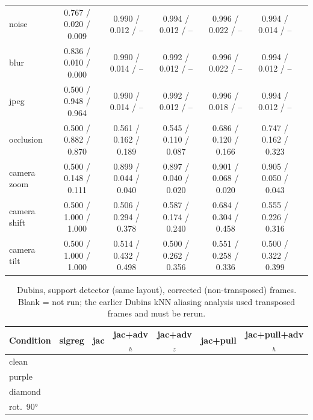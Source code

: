 \documentclass{article}
\begin{document}
\begin{table}[t]
{\begin{tabular}{lcccccc}
noise & 0.767 / 0.020 / 0.009 & 0.990 / 0.012 / -- & 0.994 / 0.012 / -- & 0.996 / 0.022 / -- & 0.994 / 0.014 / -- &  \\
blur & 0.836 / 0.010 / 0.000 & 0.990 / 0.014 / -- & 0.992 / 0.012 / -- & 0.996 / 0.022 / -- & 0.994 / 0.012 / -- &  \\
jpeg & 0.500 / 0.948 / 0.964 & 0.990 / 0.014 / -- & 0.992 / 0.012 / -- & 0.996 / 0.018 / -- & 0.994 / 0.012 / -- &  \\
occlusion & 0.500 / 0.882 / 0.870 & 0.561 / 0.162 / 0.189 & 0.545 / 0.110 / 0.087 & 0.686 / 0.120 / 0.166 & 0.747 / 0.162 / 0.323 &  \\
camera zoom & 0.500 / 0.148 / 0.111 & 0.899 / 0.044 / 0.040 & 0.897 / 0.040 / 0.020 & 0.901 / 0.068 / 0.020 & 0.905 / 0.050 / 0.043 &  \\
camera shift & 0.500 / 1.000 / 1.000 & 0.506 / 0.294 / 0.378 & 0.587 / 0.174 / 0.240 & 0.684 / 0.304 / 0.458 & 0.555 / 0.226 / 0.316 &  \\
camera tilt & 0.500 / 1.000 / 1.000 & 0.514 / 0.432 / 0.498 & 0.500 / 0.262 / 0.356 & 0.551 / 0.258 / 0.336 & 0.500 / 0.322 / 0.399 &  \\
\bottomrule
\end{tabular}}
\end{table}

\begin{table}[t]\centering\small
\caption{Dubins, support detector (same layout), corrected (non-transposed) frames. Blank = not run; the earlier Dubins kNN aliasing analysis used transposed frames and must be rerun.}
\label{tab:detect_dubins}
\begin{tabular}{lcccccc}
\toprule
Condition & sigreg & jac & jac+adv$_h$ & jac+adv$_z$ & jac+pull & jac+pull+adv$_h$ \\
\midrule
clean &  &  &  &  &  &  \\
purple &  &  &  &  &  &  \\
diamond &  &  &  &  &  &  \\
rot.\ 90° &  &  &  &  &  &  \\
\bottomrule
\end{tabular}
\end{table}
\end{document}
